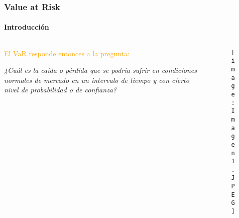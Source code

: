 \documentclass[aspectratio=169]{beamer}
\begin{document}
\begin{frame}
\frametitle{Value at Risk}
\framesubtitle{Introducción}



\begin{columns}
\begin{column}{0.5\textwidth}


\begin{center}
\textcolor{orange}{El VaR responde entonces a la pregunta:}
\end{center}

\vspace{4mm}

\textit{¿Cuál es la caída o pérdida que se podría sufrir en condiciones normales de mercado en un intervalo de tiempo y con cierto nivel de probabilidad o de confianza?
}



\end{column}
\begin{column}{0.5\textwidth}  %
\begin{figure}[h!]
\begin{center}
    \texttt{[image: Imagen1.JPEG]}
\end{center}
\end{figure}
\end{column}
\end{columns}




\end{frame}



\end{document}

